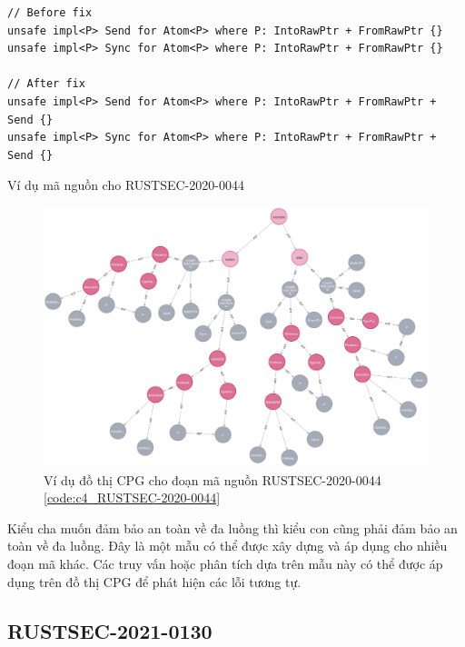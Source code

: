 \begin{listing}[H]
\begin{verbatim}
// Before fix
unsafe impl<P> Send for Atom<P> where P: IntoRawPtr + FromRawPtr {}
unsafe impl<P> Sync for Atom<P> where P: IntoRawPtr + FromRawPtr {}

// After fix
unsafe impl<P> Send for Atom<P> where P: IntoRawPtr + FromRawPtr + Send {}
unsafe impl<P> Sync for Atom<P> where P: IntoRawPtr + FromRawPtr + Send {}
\end{verbatim}
\caption{Ví dụ mã nguồn cho RUSTSEC-2020-0044}
\label{code:c4_RUSTSEC-2020-0044}
\end{listing}

\begin{figure}[H]
    \includegraphics[width=1\columnwidth]{figures/c4/c4_RUSTSEC-2020-0044.png}
    \centering
    \caption{Ví dụ đồ thị CPG cho đoạn mã nguồn RUSTSEC-2020-0044 \ref{code:c4_RUSTSEC-2020-0044}}
    \label{img:c4_RUSTSEC-2020-0044}
\end{figure}

Kiểu cha muốn đảm bảo an toàn về đa luồng thì kiểu con cũng phải đảm bảo an toàn về đa luồng.
Đây là một mẫu có thể được xây dựng và áp dụng cho nhiều đoạn mã khác.
Các truy vấn hoặc phân tích dựa trên mẫu này có thể được áp dụng trên đồ thị CPG để phát hiện các lỗi tương tự.

\subsection{RUSTSEC-2021-0130}

